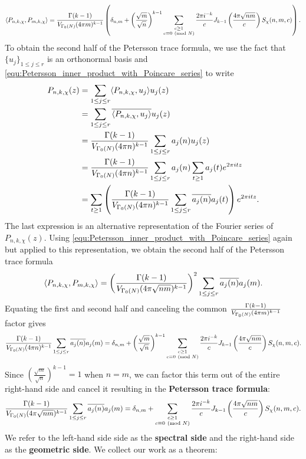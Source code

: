     \[
      \langle P_{n,k,\chi},P_{m,k,\chi}\rangle = \frac{\Gamma(k-1)}{V_{\Gamma_{0}(N)}(4\pi m)^{k-1}}\left(\delta_{n,m}+\left(\frac{\sqrt{m}}{\sqrt{n}}\right)^{k-1}\sum_{\substack{c \ge 1 \\ c \equiv 0 \ \left(\text{mod }N\right)}}\frac{2\pi i^{-k}}{c}J_{k-1}\left(\frac{4\pi\sqrt{nm}}{c}\right)S_{\chi}(n,m,c)\right).
    \]
    To obtain the second half of the Petersson trace formula, we use the fact that $\{u_{j}\}_{1 \le j \le r}$ is an orthonormal basis and \cref{equ:Petersson_inner_product_with_Poincare_series} to write
    \begin{align*}
      P_{n,k,\chi}(z) &= \sum_{1 \le j \le r}\langle P_{n,k,\chi},u_{j}\rangle u_{j}(z) \\
      &= \sum_{1 \le j \le r}\overline{\langle P_{n,k,\chi},u_{j}\rangle}u_{j}(z) \\
      &= \frac{\Gamma(k-1)}{V_{\Gamma_{0}(N)}(4\pi n)^{k-1}}\sum_{1 \le j \le r}a_{j}(n)u_{j}(z) \\
      &= \frac{\Gamma(k-1)}{V_{\Gamma_{0}(N)}(4\pi n)^{k-1}}\sum_{1 \le j \le r}a_{j}(n)\sum_{t \ge 1}a_{j}(t)e^{2\pi itz} \\
      &= \sum_{t \ge 1}\left(\frac{\Gamma(k-1)}{V_{\Gamma_{0}(N)}(4\pi n)^{k-1}}\sum_{1 \le j \le r}\overline{a_{j}(n)}a_{j}(t)\right)e^{2\pi itz}.
    \end{align*}
    The last expression is an alternative representation of the Fourier series of $P_{n,k,\chi}(z)$. Using \cref{equ:Petersson_inner_product_with_Poincare_series} again but applied to this representation, we obtain the second half of the Petersson trace formula
    \[
      \langle P_{n,k,\chi},P_{m,k,\chi}\rangle = \left(\frac{\Gamma(k-1)}{V_{\Gamma_{0}(N)}(4\pi \sqrt{nm})^{k-1}}\right)^{2}\sum_{1 \le j \le r}\overline{a_{j}(n)}a_{j}(m).
    \]
    Equating the first and second half and canceling the common $\frac{\Gamma(k-1)}{V_{\Gamma_{0}(N)}(4\pi m)^{k-1}}$ factor gives
    \[
      \frac{\Gamma(k-1)}{V_{\Gamma_{0}(N)}(4\pi n)^{k-1}}\sum_{1 \le j \le r}\overline{a_{j}(n)}a_{j}(m) = \delta_{n,m}+\left(\frac{\sqrt{m}}{\sqrt{n}}\right)^{k-1}\sum_{\substack{c \ge 1 \\ c \equiv 0 \ \left(\text{mod }N\right)}}\frac{2\pi i^{-k}}{c}J_{k-1}\left(\frac{4\pi\sqrt{nm}}{c}\right)S_{\chi}(n,m,c).
    \]
    Since $\left(\frac{\sqrt{m}}{\sqrt{n}}\right)^{k-1} = 1$ when $n = m$, we can factor this term out of the entire right-hand side and cancel it resulting in the \textbf{Petersson trace formula}:
    \[
      \frac{\Gamma(k-1)}{V_{\Gamma_{0}(N)}(4\pi\sqrt{nm})^{k-1}}\sum_{1 \le j \le r}\overline{a_{j}(n)}a_{j}(m) = \delta_{n,m}+\sum_{\substack{c \ge 1 \\ c \equiv 0 \ \left(\text{mod }N\right)}}\frac{2\pi i^{-k}}{c}J_{k-1}\left(\frac{4\pi\sqrt{nm}}{c}\right)S_{\chi}(n,m,c).
    \]
    We refer to the left-hand side side as the \textbf{spectral side} and the right-hand side as the \textbf{geometric side}. We collect our work as a theorem:

